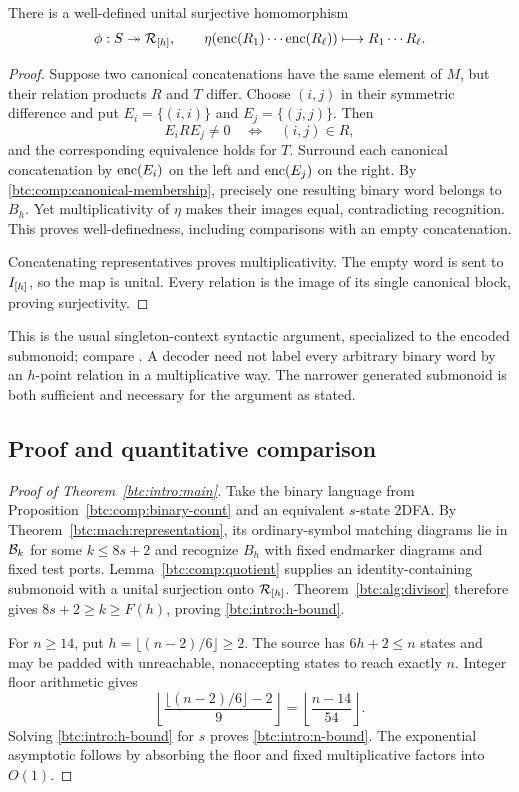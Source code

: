 \begin{lemma}\label{btc:comp:quotient}
There is a well-defined unital surjective homomorphism
\[
 \phi:S\twoheadrightarrow\mathcal{R}_{[h]},\qquad
 \eta(\operatorname{enc}(R_1)\cdots\operatorname{enc}(R_\ell))
       \longmapsto R_1\cdots R_\ell .
\]
\end{lemma}

\begin{proof}
Suppose two canonical concatenations have the same element of
$M$, but their relation products $R$ and $T$ differ. Choose
$(i,j)$ in their symmetric difference and put
$E_i=\{(i,i)\}$ and $E_j=\{(j,j)\}$. Then
\[
 E_i R E_j\ne0\quad\Longleftrightarrow\quad(i,j)\in R,
\]
and the corresponding equivalence holds for $T$.
Surround each canonical concatenation by $\operatorname{enc}(E_i)$ on the left
and $\operatorname{enc}(E_j)$ on the right. By
\eqref{btc:comp:canonical-membership}, precisely one resulting binary
word belongs to $B_h$. Yet multiplicativity of $\eta$ makes their
images equal, contradicting recognition. This proves
well-definedness, including comparisons with an empty
concatenation.

Concatenating representatives proves multiplicativity. The empty
word is sent to $I_{[h]}$, so the map is unital. Every relation
is the image of its single canonical block, proving surjectivity.
\end{proof}

This is the usual singleton-context syntactic argument, specialized
to the encoded submonoid; compare
\cite{Pin1997,OpenAILiveness2026}. A decoder need not label every
arbitrary binary word by an $h$-point relation in a multiplicative
way. The narrower generated submonoid is both sufficient and
necessary for the argument as stated.

\subsection{Proof and quantitative comparison}
\label{btc:comp:main-proof}

\begin{proof}[Proof of Theorem~\ref{btc:intro:main}]
Take the binary language from Proposition~\ref{btc:comp:binary-count}
and an equivalent $s$-state 2DFA. By
Theorem~\ref{btc:mach:representation}, its ordinary-symbol matching
diagrams lie in $\mathcal{B}_{k}$ for some $k\le8s+2$ and recognize $B_h$
with fixed endmarker diagrams and fixed test ports.
Lemma~\ref{btc:comp:quotient} supplies an identity-containing
submonoid with a unital surjection onto $\mathcal{R}_{[h]}$.
Theorem~\ref{btc:alg:divisor} therefore gives
$8s+2\ge k\ge F(h)$, proving \eqref{btc:intro:h-bound}.

For $n\ge14$, put $h=\lfloor(n-2)/6\rfloor\ge2$. The source has
$6h+2\le n$ states and may be padded with unreachable,
nonaccepting states to reach exactly $n$. Integer floor
arithmetic gives
\[
 \left\lfloor\frac{\lfloor(n-2)/6\rfloor-2}{9}\right\rfloor
 =\left\lfloor\frac{n-14}{54}\right\rfloor.
\]
Solving \eqref{btc:intro:h-bound} for $s$ proves
\eqref{btc:intro:n-bound}. The exponential asymptotic follows by
absorbing the floor and fixed multiplicative factors into $O(1)$.
\end{proof}

